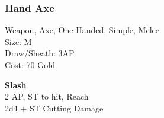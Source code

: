 \subsubsection{Hand Axe}\label{weapon:handAxe}
Weapon, Axe, One-Handed, Simple, Melee\\
Size: M\\
Draw/Sheath: 3AP\\
Cost: 70 Gold

\textbf{Slash}\\
2 AP, ST to hit,  Reach\\
2d4 + \texttimes ST Cutting Damage

